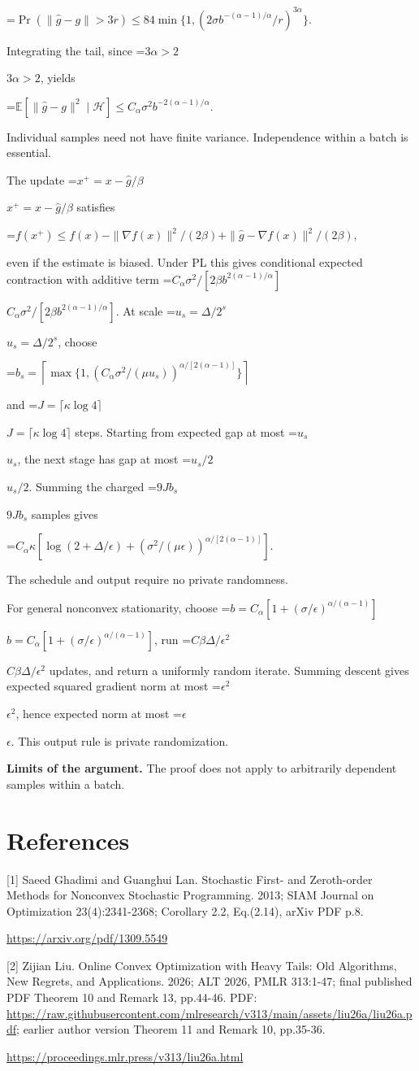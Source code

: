\documentclass[10pt,a4paper]{article}
\newcommand{\AtlasMath}[1]{\par\begingroup\centering\setbox0=\hbox{$\displaystyle #1$}\ifdim\wd0>1.4\linewidth\typeout{ATLAS WIDE FORMULA: \the\wd0}\fi\ifdim\wd0>\linewidth\resizebox{\linewidth}{!}{\box0}\else\box0\fi\par\endgroup}
\newcommand{\AtlasInlineMath}[1]{\begingroup\setbox0=\hbox{$#1$}\ifdim\wd0>.4\linewidth\endgroup\AtlasMath{#1}\else\endgroup$#1$\fi}
\begin{document}
\AtlasMath{\Pr(\|\widehat g-g\|>3r)\le
84\min\{1,(2\sigma b^{-(\alpha-1)/\alpha}/r)^{3\alpha}\}.}

Integrating the tail, since \AtlasInlineMath{3\alpha>2}, yields

\AtlasMath{\mathbb E[\|\widehat g-g\|^2\mid\mathcal H]
\le C_\alpha\sigma^2b^{-2(\alpha-1)/\alpha}.}

Individual samples need not have finite variance. Independence within a batch is essential.

The update \AtlasInlineMath{x^+=x-\widehat g/\beta} satisfies

\AtlasMath{f(x^+)\le f(x)-\|\nabla f(x)\|^2/(2\beta)
+\|\widehat g-\nabla f(x)\|^2/(2\beta),}

even if the estimate is biased. Under PL this gives conditional expected contraction with additive term
\AtlasInlineMath{C_\alpha\sigma^2/[2\beta b^{2(\alpha-1)/\alpha}]}.
At scale \AtlasInlineMath{u_s=\Delta/2^s}, choose

\AtlasMath{b_s=\left\lceil\max\{1,(C_\alpha\sigma^2/(\mu u_s))^{\alpha/[2(\alpha-1)]}\}\right\rceil}

and \AtlasInlineMath{J=\lceil\kappa\log4\rceil} steps. Starting from expected gap at most \AtlasInlineMath{u_s}, the next stage has gap at most \AtlasInlineMath{u_s/2}. Summing the charged \AtlasInlineMath{9Jb_s} samples gives

\AtlasMath{C_\alpha\kappa\left[\log(2+\Delta/\epsilon)
+(\sigma^2/(\mu\epsilon))^{\alpha/[2(\alpha-1)]}\right].}

The schedule and output require no private randomness.

For general nonconvex stationarity, choose
\AtlasInlineMath{b=C_\alpha[1+(\sigma/\epsilon)^{\alpha/(\alpha-1)}]},
run \AtlasInlineMath{C\beta\Delta/\epsilon^2} updates, and return a uniformly random iterate. Summing descent gives expected squared gradient norm at most \AtlasInlineMath{\epsilon^2}, hence expected norm at most \AtlasInlineMath{\epsilon}. This output rule is private randomization.

\textbf{Limits of the argument.} The proof does not apply to arbitrarily dependent samples within a batch.

\section{References}
[1] Saeed Ghadimi and Guanghui Lan. Stochastic First- and Zeroth-order Methods for Nonconvex Stochastic Programming. 2013; SIAM Journal on Optimization 23(4):2341-2368; Corollary 2.2, Eq.(2.14), arXiv PDF p.8.

\url{https://arxiv.org/pdf/1309.5549}

[2] Zijian Liu. Online Convex Optimization with Heavy Tails: Old Algorithms, New Regrets, and Applications. 2026; ALT 2026, PMLR 313:1-47; final published PDF Theorem 10 and Remark 13, pp.44-46. PDF: \url{https://raw.githubusercontent.com/mlresearch/v313/main/assets/liu26a/liu26a.pdf;} earlier author version Theorem 11 and Remark 10, pp.35-36.

\url{https://proceedings.mlr.press/v313/liu26a.html}
\end{document}

